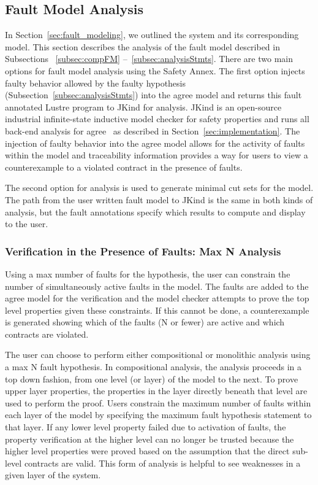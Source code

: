 \subsection{Fault Model Analysis}
In Section~\ref{sec:fault_modeling}, we outlined the system and its corresponding model. This section describes the analysis of the fault model described in Subsections ~\ref{subsec:compFM} --~\ref{subsec:analysisStmts}. There are two main options for fault model analysis using the Safety Annex. The first option injects faulty behavior allowed by the faulty hypothesis (Subsection~\ref{subsec:analysisStmts}) into the \gls{agree} model and returns this fault annotated Lustre program to JKind for analysis. JKind is an open-source industrial infinite-state inductive model checker for safety properties and runs all back-end analysis for \gls{agree}~\cite{2017arXiv171201222G} as described in Section~\ref{sec:implementation}. The injection of faulty behavior into the \gls{agree} model allows for the activity of faults within the model and traceability information provides a way for users to view a counterexample to a violated contract in the presence of faults. 

The second option for analysis is used to generate minimal cut sets for the model. The path from the user written fault model to JKind is the same in both kinds of analysis, but the fault annotations specify which results to compute and display to the user.  

\subsubsection{Verification in the Presence of Faults: Max N Analysis}
Using a max number of faults for the hypothesis, the user can constrain the number of simultaneously active faults in the model. The faults are added to the \gls{agree} model for the verification and the model checker attempts to prove the top level properties given these constraints. If this cannot be done, a counterexample is generated showing which of the faults (N or fewer) are active and which contracts are violated. 

The user can choose to perform either compositional or monolithic analysis using a max N fault hypothesis. In compositional analysis, the analysis proceeds in a top down fashion, from one level (or layer) of the model to the next. To prove upper layer properties, the properties in the layer directly beneath that level are used to perform the proof. Users constrain the maximum number of faults within each layer of the model by specifying the maximum fault hypothesis statement to that layer. If any lower level property failed due to activation of faults, the property verification at the higher level can no longer be trusted because the higher level properties were proved based on the assumption that the direct sub-level contracts are valid. This form of analysis is helpful to see weaknesses in a given layer of the system.  

